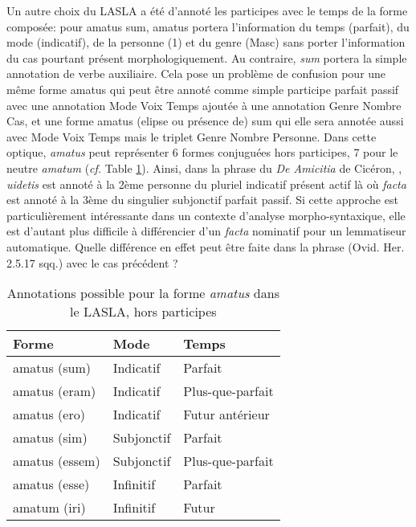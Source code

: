 Un autre choix du LASLA a été d'annoté les participes avec le temps de la forme composée: pour amatus sum, amatus portera l'information du temps (parfait), du mode (indicatif), de la personne (1) et du genre (Masc) sans porter l'information du cas pourtant présent morphologiquement. Au contraire, \textit{sum} portera la simple annotation de verbe auxiliaire. Cela pose un problème de confusion pour une même forme amatus qui peut être annoté comme simple participe parfait passif avec une annotation Mode Voix Temps ajoutée à une annotation Genre Nombre Cas, et une forme amatus (elipse ou présence de) sum qui elle sera annotée aussi avec Mode Voix Temps mais le triplet Genre Nombre Personne. Dans cette optique, \textit{amatus} peut représenter 6 formes conjuguées hors participes, 7 pour le neutre \textit{amatum} (\textit{cf.} Table \ref{table:amatus_forms}). %
%
%
Ainsi, dans la phrase du \textit{De Amicitia} de Cicéron, , \textit{uidetis} est annoté à la 2ème personne du pluriel indicatif présent actif là où \textit{facta} est annoté à la 3ème du singulier subjonctif parfait passif. Si cette approche est particulièrement intéressante dans un contexte d'analyse morpho-syntaxique, elle est d'autant plus difficile à différencier d'un \textit{facta} nominatif pour un lemmatiseur automatique. Quelle différence en effet peut être faite dans la phrase  (Ovid. Her. 2.5.17 sqq.) avec le cas précédent ? %


\newpara

\begin{table}[]
\centering
\begin{tabular}{@{}lll@{}}
\toprule
Forme & Mode & Temps \\ \midrule
amatus (sum) & Indicatif & Parfait \\
amatus (eram) & Indicatif & Plus-que-parfait \\
amatus (ero) & Indicatif & Futur antérieur \\
amatus (sim) & Subjonctif & Parfait \\
amatus (essem) & Subjonctif & Plus-que-parfait \\
amatus (esse) & Infinitif & Parfait \\
amatum (iri) & Infinitif & Futur \\ \bottomrule
\end{tabular}
\caption{Annotations possible pour la forme \textit{amatus} dans le LASLA, hors participes}
\label{table:amatus_forms}
\end{table}

